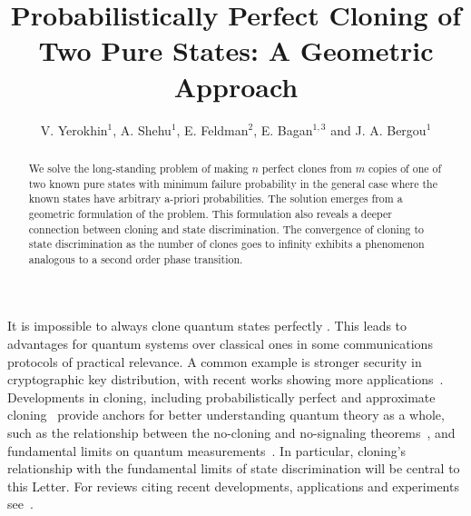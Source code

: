 \documentclass[aps,prl,twocolumn,showpacs]{revtex4}
\begin{document}
  \title{Probabilistically Perfect Cloning of Two Pure States: A Geometric Approach}
\author{V. Yerokhin$^{1}$, A. Shehu$^{1}$, E. Feldman$^{2}$, E. Bagan$^{1,3}$ and J. A. Bergou$^{1}$}

\begin{abstract} 
We solve the long-standing problem of making $n$ perfect clones from $m$ copies of one of two known pure states with minimum failure probability in the general case where the known states have arbitrary a-priori probabilities.  
The solution emerges from a geometric formulation of the problem. This formulation also reveals a deeper connection between cloning and state discrimination. The convergence of cloning to state discrimination as the number of clones goes to infinity exhibits a phenomenon analogous to a second order phase transition.
\end{abstract}
\maketitle 

It is impossible to always clone quantum states perfectly \cite{Herbert, Wooters, Dieks}.  This leads to advantages for quantum systems over classical ones in some communications protocols of practical relevance.  A common example is stronger security in cryptographic key distribution, with recent works showing more applications~\cite{Pomarico, Bart}.  Developments in cloning, including probabilistically perfect \cite {DuanGuo} and approximate cloning~\cite{Gisin1,Buzek,Brub,Chefles1,Fiurasek}  provide anchors for better understanding quantum theory as a whole, such as the relationship between the no-cloning and no-signaling theorems~\cite{Barnum}, and  fundamental limits on quantum measurements~\cite{Chiribella,Bae,Chiribella2006,Gendra}. In particular, cloning's relationship with the fundamental limits of  state discrimination will be central to this Letter. For reviews citing recent developments, applications and experiments see~\cite{review1,Fan}.
\end{document}
